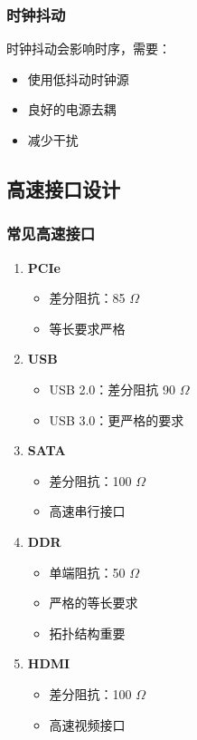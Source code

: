 \subsubsection{时钟抖动}

时钟抖动会影响时序，需要：
\begin{itemize}
  \item 使用低抖动时钟源
  \item 良好的电源去耦
  \item 减少干扰
\end{itemize}

\subsection{高速接口设计}

\subsubsection{常见高速接口}

\begin{enumerate}
  \item \textbf{PCIe}
    \begin{itemize}
      \item 差分阻抗：85 $\Omega$
      \item 等长要求严格
    \end{itemize}

  \item \textbf{USB}
    \begin{itemize}
      \item USB 2.0：差分阻抗 90 $\Omega$
      \item USB 3.0：更严格的要求
    \end{itemize}

  \item \textbf{SATA}
    \begin{itemize}
      \item 差分阻抗：100 $\Omega$
      \item 高速串行接口
    \end{itemize}

  \item \textbf{DDR}
    \begin{itemize}
      \item 单端阻抗：50 $\Omega$
      \item 严格的等长要求
      \item 拓扑结构重要
    \end{itemize}

  \item \textbf{HDMI}
    \begin{itemize}
      \item 差分阻抗：100 $\Omega$
      \item 高速视频接口
    \end{itemize}
\end{enumerate}

